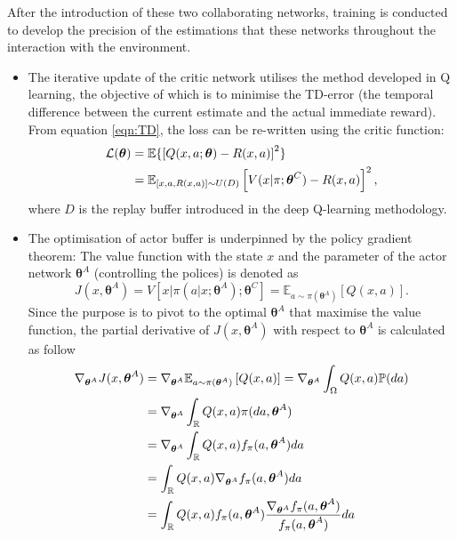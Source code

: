 \documentclass[11pt,twoside]{article}
\numberwithin{Theorem}{section}
\numberwithin{Definition}{section}
\numberwithin{Lemma}{section}
\numberwithin{Algorithm}{section}
\numberwithin{equation}{section}
\begin{document}
After the introduction of these two collaborating networks, training is conducted to develop the precision of the estimations that these networks throughout the interaction with the environment. 
\begin{itemize}
    \item The iterative update of the critic network utilises the method developed in Q learning, the objective of which is to minimise the TD-error (the temporal difference between the current estimate and the actual immediate reward). From equation \ref{eqn:TD}, the loss can be re-written using the critic function:
    \begin{align}\label{eqn:UpdateCritic}
        \mathcal{L}(\boldsymbol{\theta})&=\mathbb{E}\{\left[
Q(x,a;\boldsymbol{\theta})-R(x,a)
\right]^2\}\notag\\
&=\mathbb{E}_{[x,a,R(x,a)]\sim U(D)}\left[
V(x\vert\pi;\boldsymbol{\theta}^C)-R(x,a)
\right]^2,
    \end{align}
    where $D$ is the replay buffer introduced in the deep Q-learning methodology.
    \item The optimisation of actor buffer is underpinned by the policy gradient theorem: The value function with the state $x$ and the parameter of the actor network $\boldsymbol{\theta}^A$ (controlling the polices) is denoted as 
    $$
    J(x,\boldsymbol{\theta}^A)=V\left[x\vert\pi(a\vert x;\boldsymbol{\theta}^A);\boldsymbol{\theta}^C\right]=\mathbb{E}_{a\sim\pi(\boldsymbol{\theta}^A)}\left[Q(x,a)\right].
    $$
    Since the purpose is to pivot to the optimal $\boldsymbol{\theta}^A$ that maximise the value function, the partial derivative of $J(x,\boldsymbol{\theta}^A)$ with respect to $\boldsymbol{\theta}^A$ is calculated as follow
    \begin{align}\label{eqn:UpdateActor}
    \nabla_{\boldsymbol{\theta}^A}J(x,\boldsymbol{\theta}^A)&=\nabla_{\boldsymbol{\theta}^A}\mathbb{E}_{a\sim\pi(\boldsymbol{\theta}^A)}\left[Q(x,a)\right]=\nabla_{\boldsymbol{\theta}^A}\int_{\Omega}Q(x,a)\mathbb{P}(da)\notag\\
    &=\nabla_{\boldsymbol{\theta}^A}\int_{\mathbb{R}}Q(x,a)\pi(da,\boldsymbol{\theta}^A)\notag\\
    &=\nabla_{\boldsymbol{\theta}^A}\int_{\mathbb{R}}Q(x,a)f_{\pi}(a,\boldsymbol{\theta}^A)da\notag\\
    &=\int_{\mathbb{R}}Q(x,a)\nabla_{\boldsymbol{\theta}^A}f_{\pi}(a,\boldsymbol{\theta}^A)da\notag\\
    &=\int_{\mathbb{R}}Q(x,a)f_{\pi}(a,\boldsymbol{\theta}^A)\frac{\nabla_{\boldsymbol{\theta}^A}f_{\pi}(a,\boldsymbol{\theta}^A)}{f_{\pi}(a,\boldsymbol{\theta}^A)}da\notag\\

\end{align}
\end{itemize}
\end{document}

